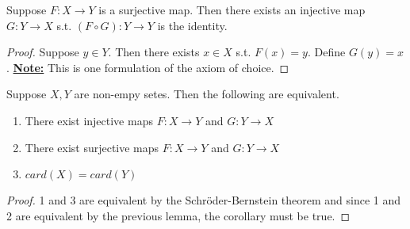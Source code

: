 \begin{lemma}
Suppose $F:X\to Y$ is a surjective map. Then there exists an injective map $G: Y\to X$ s.t. $(F \circ G): Y\to Y$ is the identity.
\end{lemma}
\begin{proof}
Suppose $y\in Y$. Then there exists $x \in X$ s.t. $F(x)=y$. Define $G(y)=x$. \newline \underline{\textbf{Note:}} This is one formulation of the axiom of choice.
\end{proof}
\begin{cor}
Suppose $X,Y$ are non-empy setes. Then the following are equivalent.
\begin{enumerate}
\item There exist injective maps $F: X\to Y$ and $G: Y\to X$
\item There exist surjective maps $F: X\to Y$ and $G: Y\to X$
\item $card(X)=card(Y)$
\end{enumerate}
\end{cor}
\begin{proof}
1 and 3 are equivalent by the Schr\"{o}der-Bernstein theorem and since 1 and 2 are equivalent by the previous lemma, the corollary must be true.
\end{proof}


